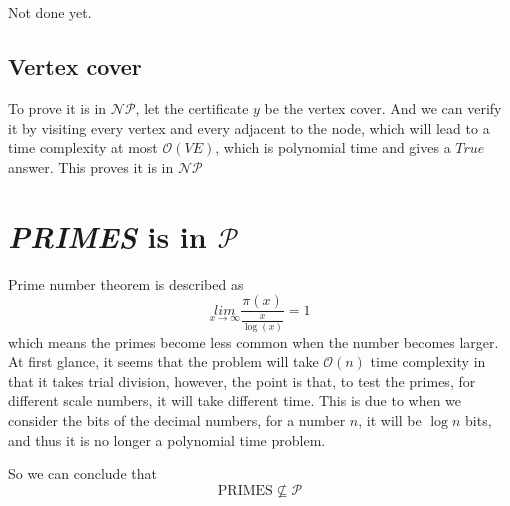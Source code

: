 \documentclass[A4paper]{article}
\begin{document}
\subsection{}
Not done yet.
\subsection{Vertex cover} 
To prove it is in $\mathcal{NP}$, let the certificate $y$ be the vertex cover. And we can verify it by visiting every vertex and every adjacent to the node, which will lead to a time complexity at most $\mathcal{O}(VE)$, which is polynomial time and gives a $True$ answer. This proves it is in $\mathcal{NP}$
\section{\textit{PRIMES} is in $\mathcal{P}$}
Prime number theorem is described as 
\[
	\underset{x\rightarrow \infty}{lim} \frac{\pi(x)}{\frac{x}{\log(x)}} = 1
\]
which means the primes become less common when the number becomes larger. At first glance, it seems that the problem will take $\mathcal{O}(n)$ time complexity in that it takes trial division, however, the point is that, to test the primes, for different scale numbers, it will take different time. This is due to when we consider the bits of the decimal numbers, for a number $n$, it will be $\log n$ bits, and thus it is no longer a polynomial time problem. 
\par So we can conclude that 
\[
	\text{PRIMES} \nsubseteq \mathcal{P}
\]
\end{document}
